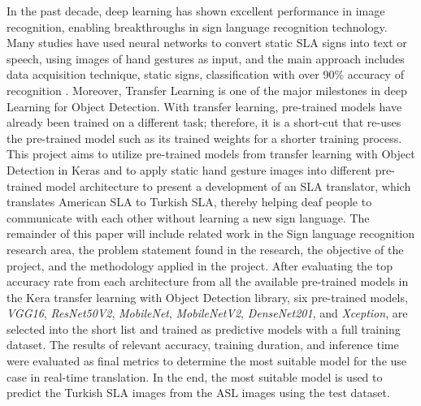 In the past decade, deep learning has shown excellent performance in image recognition, enabling breakthroughs in sign language recognition technology. Many studies have used neural networks to convert static SLA signs into text or speech, using images of hand gestures as input, and the main approach includes data acquisition technique, static signs, classification with over 90\% accuracy of recognition \cite{wadhawan2021sign}. Moreover, Transfer Learning is one of the major milestones in deep Learning for Object Detection. With transfer learning, pre-trained models have already been trained on a different task; therefore, it is a short-cut that re-uses the pre-trained model such as its trained weights for a shorter training process. This project aims to utilize pre-trained models from transfer learning with Object Detection in Keras and to apply static hand gesture images into different pre-trained model architecture to present a development of an SLA translator, which translates American SLA to Turkish SLA, thereby helping deaf people to communicate with each other without learning a new sign language. The remainder of this paper will include related work in the Sign language recognition research area, the problem statement found in the research, the objective of the project, and the methodology applied in the project. After evaluating the top accuracy rate from each architecture from all the available pre-trained models in the Kera transfer learning with Object Detection library, six pre-trained models, \textit{VGG16}, \textit{ResNet50V2}, \textit{MobileNet}, \textit{MobileNetV2}, \textit{DenseNet201}, and \textit{Xception}, are selected into the short list and trained as predictive models with a full training dataset. The results of relevant accuracy, training duration, and inference time were evaluated as final metrics to determine the most suitable model for the use case in real-time translation. In the end, the most suitable model is used to predict the Turkish SLA images from the ASL images using the test dataset.